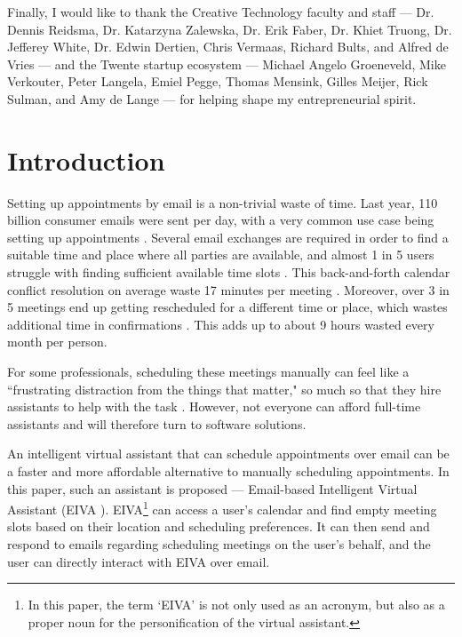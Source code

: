 \documentclass{article}
\begin{document}
Finally, I would like to thank the Creative Technology faculty and staff --- Dr. Dennis Reidsma, Dr. Katarzyna Zalewska, Dr. Erik Faber, Dr. Khiet Truong, Dr. Jefferey White, Dr. Edwin Dertien, Chris Vermaas, Richard Bults, and Alfred de Vries --- and the Twente startup ecosystem --- Michael Angelo Groeneveld, Mike Verkouter, Peter Langela, Emiel Pegge, Thomas Mensink, Gilles Meijer, Rick Sulman, and Amy de Lange --- for helping shape my entrepreneurial spirit.

\newpage

\tableofcontents

\newpage

\listoftables

\newpage

\listoffigures

\newpage

\cleardoublepage
{}


\section{Introduction}

Setting up appointments by email is a non-trivial waste of time. Last year, 110 billion consumer emails were sent per day, with a very common use case being setting up appointments \cite{noauthor_email_2019}. Several email exchanges are required in order to find a suitable time and place where all parties are available, and almost 1 in 5 users struggle with finding sufficient available time slots \cite{blaszkiewicz_research_2018}. This back-and-forth calendar conflict resolution on average waste 17 minutes per meeting \cite{dennis_4_2017}. Moreover, over 3 in 5 meetings end up getting rescheduled for a different time or place, which wastes additional time in confirmations \cite{dennis_how_2018}. This adds up to about 9 hours wasted every month per person.

For some professionals, scheduling these meetings manually can feel like a ``frustrating distraction from the things that matter," so much so that they hire assistants to help with the task \cite{cranshaw_calendar.help:_2017}. However, not everyone can afford full-time assistants and will therefore turn to software solutions.

An intelligent virtual assistant that can schedule appointments over email can be a faster and more affordable alternative to manually scheduling appointments. In this paper, such an assistant is proposed --- Email-based Intelligent Virtual Assistant (EIVA ). EIVA\footnote{In this paper, the term `EIVA' is not only used as an acronym, but also as a proper noun for the personification of the virtual assistant.} can access a user's calendar and find empty meeting slots based on their location and scheduling preferences. It can then send and respond to emails regarding scheduling meetings on the user's behalf, and the user can directly interact with EIVA over email.
\end{document}
